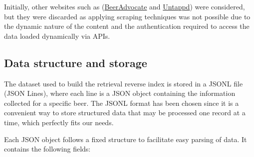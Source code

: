 Initially, other websites such as (\href{https://www.beeradvocate.com/}{BeerAdvocate} and \href{https://untappd.com/}{Untappd}) were considered, but they were discarded as applying scraping techniques was not possible due to the dynamic nature of the content and the authentication required to access the data loaded dynamically via APIs.

\subsection{Data structure and storage}

The dataset used to build the retrieval reverse index is stored in a JSONL file (JSON Lines), where each line is a JSON object containing the information collected for a specific beer. The JSONL format has been chosen since it is a convenient way to store structured data that may be processed one record at a time, which perfectly fits our needs.

Each JSON object follows a fixed structure to facilitate easy parsing of data. It contains the following fields:

